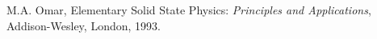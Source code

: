 \begin{thebibliography}{9}
    M.A. Omar, Elementary Solid State Physics:  
    \textit{Principles and Applications}, 
    Addison-Wesley, London, 1993.
    
\end{thebibliography}